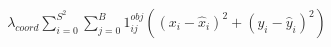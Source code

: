 \documentclass[preview]{standalone}
\begin{document}
\begin{align*}
\lambda_{coord}\sum_{i=0}^{S^2}\sum_{j=0}^{B}1_{ij}^{obj}\left((x_i-\hat{x}_i)^2+(y_i-\hat{y}_i)^2\right)
\end{align*}
\end{document}
